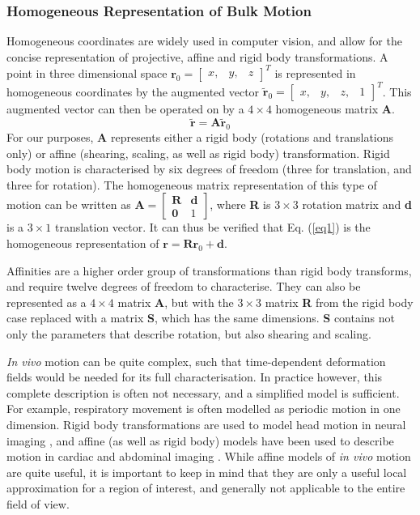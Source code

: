 \documentclass[class=article, crop=false]{standalone}
\begin{document}
\subsubsection*{Homogeneous Representation of Bulk Motion}
Homogeneous coordinates are widely used in computer vision, and allow for the concise representation of projective, affine and rigid body transformations. A point in three dimensional space $\textbf{r}_0 = \begin{bmatrix} x,&y,&z\end{bmatrix}^{T}$ is represented in homogeneous coordinates by the augmented vector $\tilde{\textbf{r}}_0 = \begin{bmatrix}x,&y,&z,&1\end{bmatrix}^{T}$. This augmented vector can then be operated on by a $4\times4$ homogeneous matrix \textbf{A}.
\begin{equation}
	\label{eq1}
	\tilde{\textbf{r}} = \textbf{A}\tilde{\textbf{r}}_0
\end{equation}
For our purposes, \textbf{A} represents either a rigid body (rotations and translations only) or affine (shearing, scaling, as well as rigid body) transformation. Rigid body motion is characterised by six degrees of freedom (three for translation, and three for rotation). The homogeneous matrix representation of this type of motion can be written as $\textbf{A} = \begin{bmatrix} \textbf{R} & \textbf{d} \\ \textbf{0} & 1 \end{bmatrix}$, where \textbf{R} is $3\times3$ rotation matrix and \textbf{d} is a $3\times1$ translation vector. It can thus be verified that Eq. (\ref{eq1}) is the homogeneous representation of $\textbf{r} = \textbf{R} \textbf{r}_0 + \textbf{d}$.
\par
Affinities are a higher order group of transformations than rigid body transforms, and require twelve degrees of freedom to characterise. They can also be represented as a $4\times4$ matrix \textbf{A}, but with the $3\times3$ matrix \textbf{R} from the rigid body case replaced with a matrix \textbf{S}, which has the same dimensions. \textbf{S} contains not only the parameters that describe rotation, but also shearing and scaling.
\par
\textit{In vivo} motion can be quite complex, such that time-dependent deformation fields would be needed for its full characterisation. In practice however, this complete description is often not necessary, and a simplified model is sufficient. For example, respiratory movement is often modelled as periodic motion in one dimension. Rigid body transformations are used to model head motion in neural imaging \parencite{Godenschweger2016}, and affine (as well as rigid body) models have been used to describe motion in cardiac and abdominal imaging \parencite{Henningsson2014,Nehrke2005,Manke2002}. While affine models of \textit{in vivo} motion are quite useful, it is important to keep in mind that they are only a useful local approximation for a region of interest, and generally not applicable to the entire field of view.
\end{document}
